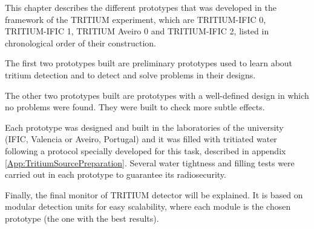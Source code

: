 This chapter describes the different prototypes that was developed in the framework of the TRITIUM experiment, which are TRITIUM-IFIC 0, TRITIUM-IFIC 1, TRITIUM Aveiro 0 and TRITIUM-IFIC 2, listed in chronological order of their construction.

The first two prototypes built are preliminary prototypes used to learn about tritium detection and to detect and solve problems in their designs.

The other two prototypes built are prototypes with a well-defined design in which no problems were found. They were built to check more subtle effects. 

Each prototype was designed and built in the laboratories of the university (IFIC, Valencia or Aveiro, Portugal) and it was filled with tritiated water following a protocol specially developed for this task, described in appendix \ref{App:TritiumSourcePreparation}. Several water tightness and filling tests were carried out in each prototype to guarantee its radiosecurity.

Finally, the final monitor of TRITIUM detector will be explained. It is based on modular detection units for easy scalability, where each module is the chosen prototype (the one with the best results).